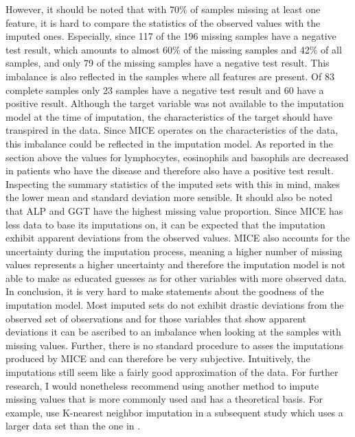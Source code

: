 However, it should be noted that with 70\% of samples missing at least one 
feature, it is hard to compare the statistics of the observed values with the 
imputed ones. Especially, since 117 of the 196 missing samples have a negative 
test result, which amounts to almost 60\% of the missing samples and 42\% of 
all samples, and only 79 of the missing samples have a negative test result. 
This imbalance is also reflected in the samples where all features are present. 
Of 83 complete samples only 23 samples have a negative test result and 60 have 
a positive result. Although the target variable was not available to the 
imputation model at the time of imputation, the characteristics of the target 
should have transpired in the data.
Since MICE operates on the characteristics 
of the data, this imbalance could be reflected in the imputation model. As 
reported in the section above the values for lymphocytes, eosinophils and 
basophils are decreased in patients who have the disease and therefore also 
have a positive test result. Inspecting the summary statistics of the 
imputed sets with this in mind, makes the lower mean and standard deviation 
more sensible.
It should also be noted that ALP and GGT have the highest missing value 
proportion. Since MICE has less data to base its imputations on, it can be 
expected that the imputation exhibit apparent deviations from the observed 
values. MICE also accounts for the uncertainty during the imputation process, 
meaning a higher number of missing values represents a higher uncertainty and 
therefore the imputation model is not able to make as educated guesses as for 
other variables with more observed data.
\\
In conclusion, it is very hard to make statements about the goodness of the 
imputation model. Most imputed sets do not exhibit drastic deviations from the 
observed set of observations and for those variables that show apparent 
deviations it can be ascribed to an imbalance when looking at the samples with 
missing values. Further, there is no standard procedure to asses the 
imputations produced by MICE and can therefore be very subjective. Intuitively, 
the imputations still seem like a fairly good approximation of the data.
For further research, I would nonetheless recommend using another method to 
impute missing values that is more commonly used and has a theoretical basis. 
For example, \citeauthor{RN127} use K-nearest neighbor imputation in a 
subsequent study \cite{RN179} which uses a larger data set than the one in 
\cite{RN127}.
